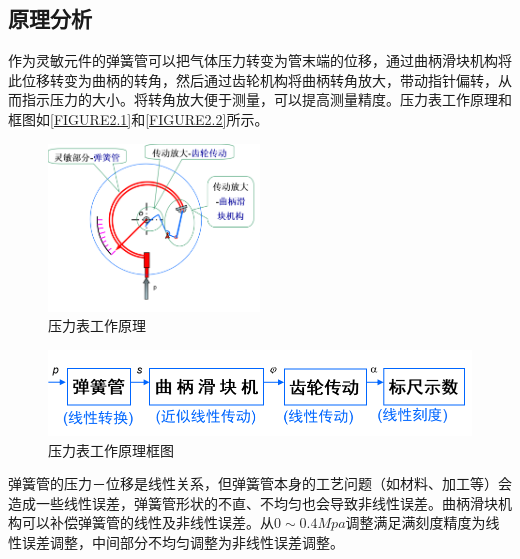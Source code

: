 \subsection{原理分析}
作为灵敏元件的弹簧管可以把气体压力转变为管末端的位移，通过曲柄滑块机构将此位移转变为曲柄的转角，然后通过齿轮机构将曲柄转角放大，带动指针偏转，从而指示压力的大小。将转角放大便于测量，可以提高测量精度。压力表工作原理和框图如\autoref{FIGURE2.1}和\autoref{FIGURE2.2}所示。
\begin{figure}[!htbp]
    \centering
    \includegraphics[width =0.5\textwidth]{figures/2.1.png}
    \caption{压力表工作原理}
    \label{FIGURE2.1}
\end{figure}
\begin{figure}[!htbp]
    \centering
    \includegraphics[width =\textwidth]{figures/2.2.png}
    \caption{压力表工作原理框图}
    \label{FIGURE2.2}
\end{figure}
\newline

弹簧管的压力－位移是线性关系，但弹簧管本身的工艺问题（如材料、加工等）会造成一些线性误差，弹簧管形状的不直、不均匀也会导致非线性误差。曲柄滑块机构可以补偿弹簧管的线性及非线性误差。从$0{\sim}0.4Mpa$调整满足满刻度精度为线性误差调整，中间部分不均匀调整为非线性误差调整。

